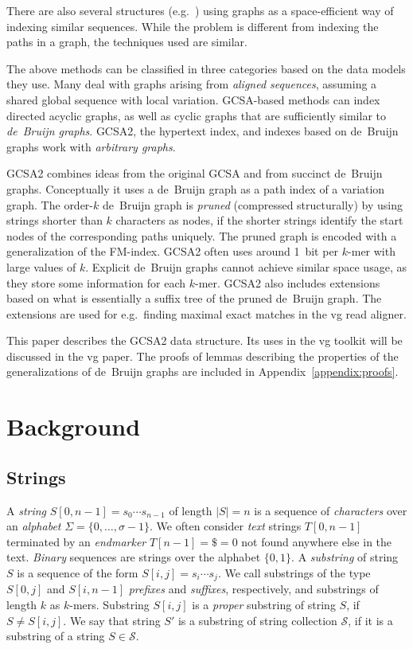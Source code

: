\documentclass[a4paper,UKenglish]{lipics-v2016}
\newcommand{\set}[1]{\ensuremath{\{ #1 \}}}
\newcommand{\abs}[1]{\ensuremath{\lvert #1 \rvert}}
\newcommand{\kmer}[1]{$#1$\nobreakdash-mer}
\newcommand{\orderk}[1]{order\nobreakdash-$#1$}
\begin{document}
There are also several structures (e.g.~\cite{Huang2010,Wandelt2013,Danek2014,Na2015,Na2016}) using graphs as a space-efficient way of indexing similar sequences. While the problem is different from indexing the paths in a graph, the techniques used are similar.

The above methods can be classified in three categories based on the data models they use. Many deal with graphs arising from \emph{aligned sequences}, assuming a shared global sequence with local variation. GCSA-based methods can index directed acyclic graphs, as well as cyclic graphs that are sufficiently similar to \emph{de~Bruijn graphs}. GCSA2, the hypertext index, and indexes based on de~Bruijn graphs work with \emph{arbitrary graphs}.

GCSA2 combines ideas from the original GCSA and from succinct de~Bruijn graphs. Conceptually it uses a de~Bruijn graph as a path index of a variation graph. The \orderk{k} de~Bruijn graph is \emph{pruned} (compressed structurally) by using strings shorter than $k$ characters as nodes, if the shorter strings identify the start nodes of the corresponding paths uniquely. The pruned graph is encoded with a generalization of the FM\nobreakdash-index. GCSA2 often uses around 1~bit per \kmer{k} with large values of $k$. Explicit de~Bruijn graphs cannot achieve similar space usage, as they store some information for each \kmer{k}. GCSA2 also includes extensions based on what is essentially a suffix tree of the pruned de~Bruijn graph. The extensions are used for e.g.~finding maximal exact matches in the vg read aligner.

This paper describes the GCSA2 data structure. Its uses in the vg toolkit will be discussed in the vg paper. The proofs of lemmas describing the properties of the generalizations of de~Bruijn graphs are included in Appendix~\ref{appendix:proofs}.


\section{Background}

\subsection{Strings}\label{sect:strings}

A \emph{string} $S[0, n-1] = s_{0} \dotsm s_{n-1}$ of length $\abs{S} = n$ is a sequence of \emph{characters} over an \emph{alphabet} $\Sigma = \set{0, \dotsc, \sigma - 1}$. We often consider \emph{text} strings $T[0, n-1]$ terminated by an \emph{endmarker} $T[n-1] = \$ = 0$ not found anywhere else in the text. \emph{Binary} sequences are strings over the alphabet $\set{0, 1}$. A \emph{substring} of string $S$ is a sequence of the form $S[i, j] = s_{i} \dotsm s_{j}$. We call substrings of the type $S[0, j]$ and $S[i, n-1]$ \emph{prefixes} and \emph{suffixes}, respectively, and substrings of length $k$ as \kmer{k}s. Substring $S[i, j]$ is a \emph{proper} substring of string $S$, if $S \ne S[i, j]$. We say that string $S'$ is a substring of string collection $\mathcal{S}$, if it is a substring of a string $S \in \mathcal{S}$.
\end{document}
